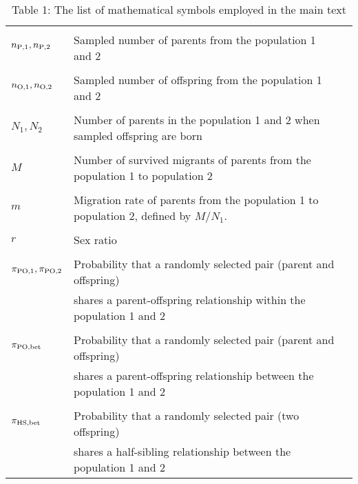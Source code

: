 \documentclass[12pt, English]{article}
\begin{document}
\begin{spacing}{1.9}



\clearpage

\renewcommand{\arraystretch}{0.6}
\begin{table}[tb]
   \caption[]{Table 1: The list of mathematical symbols employed in the main text}
    \textbf {}\\[-4mm]
    \begin{tabular}{llc} \hline
       & & \\
	$n_{\rm P,1}, n_{\rm P, 2}$			& Sampled number of parents from the population 1 and 2\\ 
		                						& \\
	$n_{\rm O, 1}, n_{\rm O, 2}$			& Sampled number of offspring from the population 1 and 2\\ 
		                						& \\
	$N_{1}, N_{2}$						& Number of parents in the population 1 and 2 when sampled offspring are born\\
		                						& \\
	$M$								& Number of survived migrants of parents from the population 1 to population 2\\
		                						& \\
	$m$								& Migration rate of parents from the population 1 to population 2, defined by $M/N_1$.\\
		                						& \\
	$r$								& Sex ratio\\
		                						& \\
	$\pi_{\rm PO,1}, \pi_{\rm PO,2}$		& Probability that a randomly selected pair (parent and offspring) \\
	                							& shares a parent-offspring relationship within the population 1 and 2\\
									& \\
	$\pi_{\rm PO, bet}$					& Probability that a randomly selected pair (parent and offspring) \\
	                							& shares a parent-offspring relationship between the population 1 and 2\\
									& \\
	$\pi_{\rm HS, bet}$					& Probability that a randomly selected pair (two offspring) \\
	                							& shares a half-sibling relationship between the population 1 and 2\\

\end{tabular}
\end{table}
\end{spacing}
\end{document}
